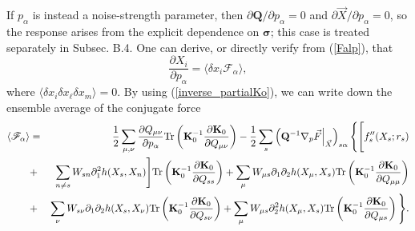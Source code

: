 If $p_\alpha$ is instead a noise-strength parameter, then $\partial \mathbf{Q}/\partial p_\alpha=0$ and $\partial \vec{X}/\partial p_\alpha=0$, so the response arises from the explicit dependence on $\boldsymbol{\sigma}$; this case is treated separately in Subsec. B.4. One can derive, or directly verify from (\ref{Falp}), that
\begin{equation}
    \frac{\partial X_i}{\partial p_\alpha} =\langle \delta x_i {\mathscr F}_\alpha\rangle,
\end{equation}
where $\langle \delta x_i \delta x_\ell \delta x_m \rangle=0$. By using (\ref{inverse_partialKo}), we can write down the ensemble average of the conjugate force
\begin{eqnarray}
\langle{{\mathscr F}_\alpha}\rangle&=& \frac{1}{2} \sum_{\mu,\nu} \frac {\partial Q_{\mu\nu}}{\partial p_\alpha} \text{Tr}\left({\bf K}_0^{-1} \frac{\partial {\bf K}_0} {\partial Q_{\mu\nu}}\right)-\frac{1}{2} \sum_s \left({\bf Q}^{-1} \nabla_p{\vec { F}} \Big|_{\vec X}\right)_{s\alpha}\Bigg\{ \Bigg[ f_s''(X_s;r_s)\\
&+&\sum_{n\neq s} W_{sn} \partial^2_1 h(X_s, X_n) \Bigg] \text{Tr}\left({\bf K}_0^{-1} \frac{\partial {\bf K}_0} {\partial Q_{ss}}\right)+\sum_\mu W_{\mu s} \partial_1 \partial_2 h(X_\mu, X_s) \text{Tr}\left({\bf K}_0^{-1} \frac{\partial {\bf K}_0} {\partial Q_{\mu\mu}}\right)\nonumber\\
&+& \sum_\nu W_{s\nu}\partial_1\partial_2 h(X_s,X_\nu) \text{Tr}\left({\bf K}_0^{-1} \frac{\partial {\bf K}_0} {\partial Q_{s\nu}}\right)+ \sum_\mu W_{\mu s} \partial^2_2 h(X_\mu, X_s) \text{Tr}\left({\bf K}_0^{-1} \frac{\partial {\bf K}_0} {\partial Q_{\mu s}}\right) \Bigg\}.\nonumber
\end{eqnarray}
